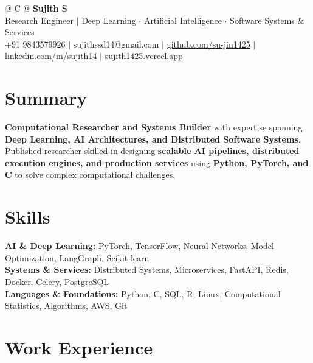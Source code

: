 \documentclass[a4paper,11pt]{article}
\newcommand{\ulink}[2]{\href{#1}{#2}}
\begin{document}
\pagestyle{empty}

\begin{tabularx}{\linewidth}{@{} C @{}}
{\color[HTML]{000000}\fontsize{30}{35}\selectfont\bfseries Sujith S} \\[5pt]
{\fontsize{10.5}{12.5}\selectfont\color[HTML]{3A3A3A}
Research Engineer $|$ Deep Learning $\cdot$ Artificial Intelligence $\cdot$ Software Systems \& Services} \\[6pt]
{\fontsize{9.5}{11.5}\selectfont\textcolor[HTML]{3A3A3A}{+91 9843579926 $|$ sujithssd14@gmail.com $|$ \ulink{https://github.com/su-jin1425}{github.com/su-jin1425} $|$ \ulink{https://linkedin.com/in/sujith14}{linkedin.com/in/sujith14} $|$ \ulink{https://sujith1425.vercel.app}{sujith1425.vercel.app}}}
\end{tabularx}

\section{Summary}
\vspace{2pt}

{\color[HTML]{0A0A0A}\fontsize{11}{14}\selectfont
\textbf{Computational Researcher and Systems Builder} with expertise spanning \textbf{Deep Learning, AI Architectures, and Distributed Software Systems}. Published researcher skilled in designing \textbf{scalable AI pipelines, distributed execution engines, and production services} using \textbf{Python, PyTorch, and C} to solve complex computational challenges.}

\section{Skills}
\vspace{2pt}

{\color[HTML]{0A0A0A}\fontsize{11}{14}\selectfont
\textbf{AI \& Deep Learning:} PyTorch, TensorFlow, Neural Networks, Model Optimization, LangGraph, Scikit-learn \\[2pt]
\textbf{Systems \& Services:} Distributed Systems, Microservices, FastAPI, Redis, Docker, Celery, PostgreSQL \\[2pt]
\textbf{Languages \& Foundations:} Python, C, SQL, R, Linux, Computational Statistics, Algorithms, AWS, Git}

\section{Work Experience}
\vspace{2pt}
\end{document}
